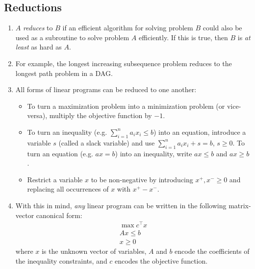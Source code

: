 \documentclass[10pt]{article}
\begin{document}
\begin{multicols}{2}
\begin{addmargin}[0.8em]{0.5em}
    \subsection{Reductions}
    \vspace{-0.4cm}
    \begin{enumerate}[label=(\alph*)]
        \item $A$ \textit{reduces} to $B$ if an efficient algorithm for solving problem $B$ could also be used as a subroutine to solve problem $A$ efficiently. If this is true, then $B$ is \textit{at least} as hard as $A$.
        \item For example, the longest increasing subsequence problem reduces to the longest path problem in a DAG. 
        \item All forms of linear programs can be reduced to one another:
        \begin{itemize}
        \item To turn a maximization problem into a minimization problem (or vice-versa), multiply the objective function by $-1$. 
        \item To turn an inequality (e.g. $\sum_{i=1}^{n} a_i x_i\leq b$) into an equation, introduce a variable $s$ (called a slack variable) and use $\sum_{i=1}^{n} a_i x_i + s = b$, $s \geq 0$. To turn an equation (e.g. $ax=b$) into an inequality, write $ax\leq b$ and $ax\geq b$.
        \item Restrict a variable $x$ to be non-negative by introducing $x^+, x^- \geq 0$ and replacing all occurrences of $x$ with $x^+ - x^-$.
        \end{itemize}
        
        \item With this in mind, \textit{any} linear program can be written in the following matrix-vector canonical form:
        \begin{align*}
        \max{c^\top x} \\
        Ax \leq b \\
        x \geq 0
        \end{align*}
        where $x$ is the unknown vector of variables, $A$ and $b$ encode the coefficients of the inequality constraints, and $c$ encodes the objective function.
    \end{enumerate}    
    \vspace{-0.3cm}

\end{addmargin}
\end{multicols}
\end{document}
